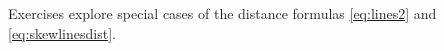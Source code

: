 {\noindent Exercises}
{ explore special cases of the distance formulas \eqref{eq:lines2} and \eqref{eq:skewlinesdist}.
}
